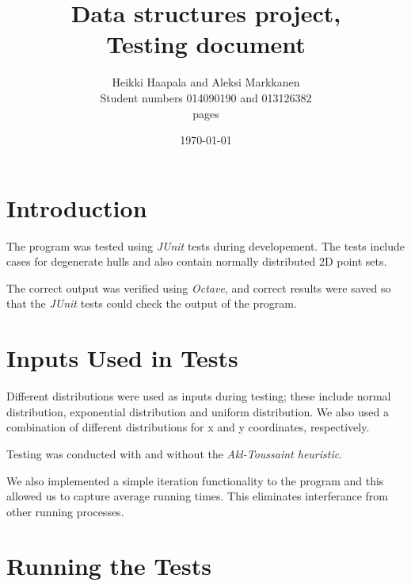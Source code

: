 \documentclass[a4paper,12pt,leqno,titlepage]{article}
\begin{document}
\begin{titlepage}
\title{Data structures project, \\
Testing document}
\author{Heikki Haapala and Aleksi Markkanen\\
Student numbers 014090190 and 013126382\\
\pageref{LastPage} pages}
\date{\today}
\end{titlepage}
\maketitle
\pagebreak
\tableofcontents
\pagebreak

\section{Introduction}
The program was tested using \emph{JUnit} tests during developement.
The tests include cases for degenerate hulls and also contain normally distributed 2D point sets.

The correct output was verified using \emph{Octave}, and correct results were saved so that the \emph{JUnit} tests could check the output of the program.


\pagebreak
\section{Inputs Used in Tests}
Different distributions were used as inputs during testing; these include normal distribution, exponential distribution and uniform distribution. We also used a combination of different distributions for x and y coordinates, respectively.

Testing was conducted with and without the \emph{Akl-Toussaint heuristic}.

We also implemented a simple iteration functionality to the program and this allowed us to capture average running times.
This eliminates interferance from other running processes.


\pagebreak
\section{Running the Tests}
\end{document}
